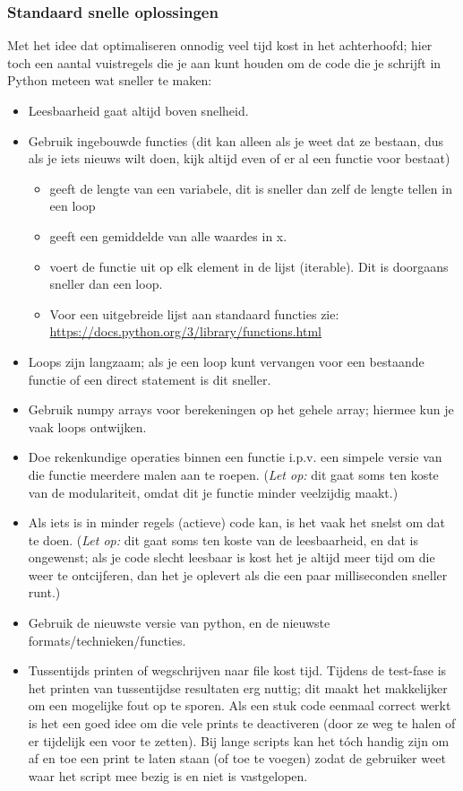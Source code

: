 \documentclass[a4paper,11pt, fleqn]{article}
\begin{document}
\subsubsection{Standaard snelle oplossingen}
Met het idee dat optimaliseren onnodig veel tijd kost in het achterhoofd; hier toch een aantal vuistregels die je aan kunt houden om de code die je schrijft in Python meteen wat sneller te maken:
\begin{itemize}
	\item Leesbaarheid gaat altijd boven snelheid.
	\item Gebruik ingebouwde functies (dit kan alleen als je weet dat ze bestaan, dus als je iets nieuws wilt doen, kijk altijd even of er al een functie voor bestaat)
	\begin{itemize}
		\item {} geeft de lengte van een variabele, dit is sneller dan zelf de lengte tellen in een loop
		\item {} geeft een gemiddelde van alle waardes in x.
		\item {} voert de functie uit op elk element in de lijst (iterable). Dit is doorgaans sneller dan een loop.
		\item Voor een uitgebreide lijst aan standaard functies zie: \url{https://docs.python.org/3/library/functions.html}
	\end{itemize}
	\item Loops zijn langzaam; als je een loop kunt vervangen voor een bestaande functie of een direct statement is dit sneller.
	\item Gebruik numpy arrays voor berekeningen op het gehele array; hiermee kun je vaak loops ontwijken.
	\item Doe rekenkundige operaties binnen een functie i.p.v. een simpele versie van die functie meerdere malen aan te roepen. (\textit{Let op:} dit gaat soms ten koste van de modulariteit, omdat dit je functie minder veelzijdig maakt.)
	\item Als iets is in minder regels (actieve) code kan, is het vaak het snelst om dat te doen. (\textit{Let op:} dit gaat soms ten koste van de leesbaarheid, en dat is ongewenst; als je code slecht leesbaar is kost het je altijd meer tijd om die weer te ontcijferen, dan het je oplevert als die een paar milliseconden sneller runt.)
	\item Gebruik de nieuwste versie van python, en de nieuwste formats/technieken/functies.
	\item Tussentijds printen of wegschrijven naar file kost tijd. Tijdens de test-fase is het printen van tussentijdse resultaten erg nuttig; dit maakt het makkelijker om een mogelijke fout op te sporen. Als een stuk code eenmaal correct werkt is het een goed idee om die vele prints te deactiveren (door ze weg te halen of er tijdelijk een \pythoninline{#} voor te zetten). Bij lange scripts kan het t\'och handig zijn om af en toe een print te laten staan (of toe te voegen) zodat de gebruiker weet waar het script mee bezig is en niet is vastgelopen.
\end{itemize}
\end{document}
